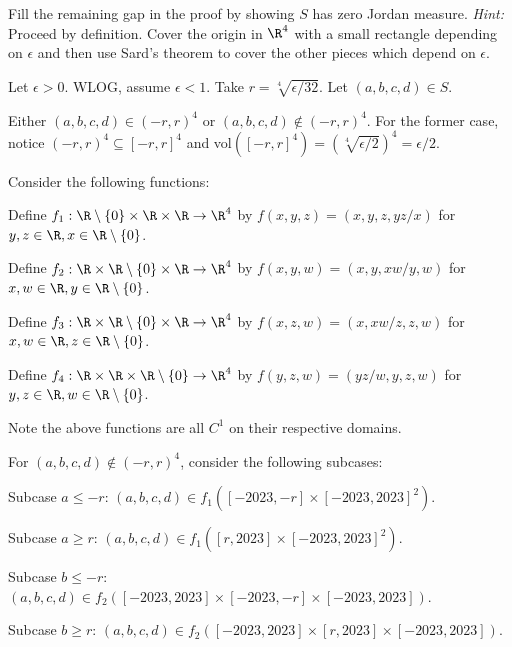 \documentclass{exam}
\begin{document}
\begin{questions}
\begin{parts}
\item Fill the remaining gap in the proof by showing $S$ has zero Jordan measure. \textit{Hint:} Proceed by definition. Cover the origin in $\R^4$ with a small rectangle depending on $\epsilon$ and then use Sard's theorem to cover the other pieces which depend on $\epsilon$.

\begin{answer}{590pt}
Let $\epsilon > 0$. WLOG, assume $\epsilon < 1$. Take $r = \sqrt[4]{\epsilon/32}$. Let $(a,b,c,d) \in S$.\newline\

Either $(a,b,c,d) \in (-r,r)^4$ or $(a,b,c,d) \notin (-r,r)^4$. For the former case, notice $(-r,r)^4 \subseteq [-r,r]^4$ and vol$([-r,r]^4) = (\sqrt[4]{\epsilon/2})^4 = \epsilon/2$.\newline\

Consider the following functions:\

Define $f_1: \R \setminus \{0\} \times \R \times \R \to \R^4$ by $f(x,y,z) = (x,y,z,yz/x)$ for $y, z \in \R, x \in \R \setminus \{0\}$.\

Define $f_2: \R \times \R \setminus \{0\} \times \R \to \R^4$ by $f(x,y,w) = (x,y,xw/y,w)$ for $x, w \in \R, y \in  \R \setminus \{0\}$.\

Define $f_3: \R \times \R \setminus \{0\} \times \R \to \R^4$ by $f(x,z,w) = (x,xw/z,z,w)$ for $x, w \in \R, z \in  \R \setminus \{0\}$.\

Define $f_4: \R \times \R \times \R \setminus \{0\} \to \R^4$ by $f(y,z,w) = (yz/w,y,z,w)$ for $y, z \in \R, w \in  \R \setminus \{0\}$.\

Note the above functions are all $C^1$ on their respective domains.\newline\

For $(a,b,c,d) \notin (-r,r)^4$, consider the following subcases:\newline\

Subcase $a \leq -r$: $(a,b,c,d) \in f_1([-2023,-r]\times[-2023,2023]^2)$.\

Subcase $a \geq r$: $(a,b,c,d) \in f_1([r,2023]\times[-2023,2023]^2)$.\

Subcase $b \leq -r$: $(a,b,c,d) \in f_2([-2023,2023]\times[-2023,-r]\times[-2023,2023])$.\

Subcase $b \geq r$: $(a,b,c,d) \in f_2([-2023,2023]\times[r,2023]\times[-2023,2023])$.\newline\


\end{answer}
\end{parts}
\end{questions}
\end{document}
